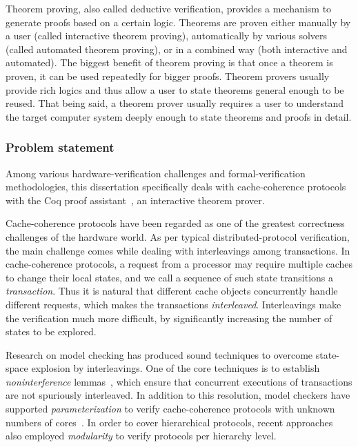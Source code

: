 Theorem proving, also called deductive verification, provides a mechanism to generate proofs based on a certain logic.
Theorems are proven either manually by a user (called interactive theorem proving), automatically by various solvers (called automated theorem proving), or in a combined way (both interactive and automated).
The biggest benefit of theorem proving is that once a theorem is proven, it can be used repeatedly for bigger proofs.
Theorem provers usually provide rich logics and thus allow a user to state theorems general enough to be reused.
That being said, a theorem prover usually requires a user to understand the target computer system deeply enough to state theorems and proofs in detail.

\subsubsection{Problem statement}

Among various hardware-verification challenges and formal-verification methodologies, this dissertation specifically deals with cache-coherence protocols with the Coq proof assistant~\cite{Coq}, an interactive theorem prover.

Cache-coherence protocols have been regarded as one of the greatest correctness challenges of the hardware world.
As per typical distributed-protocol verification, the main challenge comes while dealing with interleavings among transactions.
In cache-coherence protocols, a request from a processor may require multiple caches to change their local states, and we call a sequence of such state transitions a \emph{transaction}.
Thus it is natural that different cache objects concurrently handle different requests, which makes the transactions \emph{interleaved}.
Interleavings make the verification much more difficult, by significantly increasing the number of states to be explored.

Research on model checking has produced sound techniques to overcome state-space explosion by interleavings.
One of the core techniques is to establish \emph{noninterference} lemmas~\cite{McMillan:1999,McMillan:2001,Chou:2004,flow:Talupur:2008,flow:OLeary:2009,flow:Sethi:2014}, which ensure that concurrent executions of transactions are not spuriously interleaved.
In addition to this resolution, model checkers have supported \emph{parameterization} to verify cache-coherence protocols with unknown numbers of cores~\cite{Zhang:2010,Zhang:2014,Banks:2017}.
In order to cover hierarchical protocols, recent approaches~\cite{Chen:2008,Chen:2010,Opeoluwa:2016,Opeoluwa:2017,Oswald:2020} also employed \emph{modularity} to verify protocols per hierarchy level.

